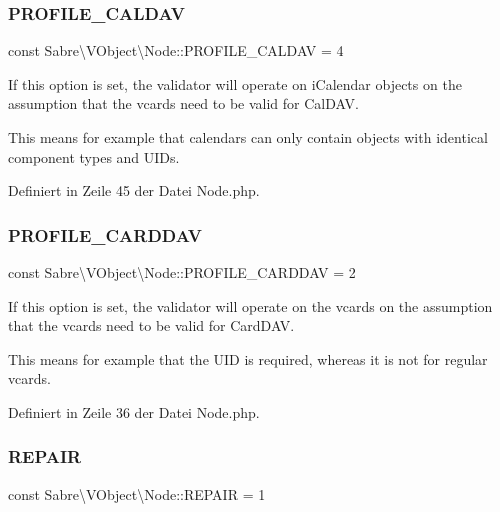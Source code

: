 \subsubsection{\texorpdfstring{P\+R\+O\+F\+I\+L\+E\+\_\+\+C\+A\+L\+D\+AV}{PROFILE\_CALDAV}}
{\footnotesize\ttfamily const Sabre\textbackslash{}\+V\+Object\textbackslash{}\+Node\+::\+P\+R\+O\+F\+I\+L\+E\+\_\+\+C\+A\+L\+D\+AV = 4}

If this option is set, the validator will operate on i\+Calendar objects on the assumption that the vcards need to be valid for Cal\+D\+AV.

This means for example that calendars can only contain objects with identical component types and U\+I\+Ds. 

Definiert in Zeile 45 der Datei Node.\+php.

\mbox{\label{class_sabre_1_1_v_object_1_1_node_a0aac3de0b04bcc44bbf0e22ae47a51c3}} 
\subsubsection{\texorpdfstring{P\+R\+O\+F\+I\+L\+E\+\_\+\+C\+A\+R\+D\+D\+AV}{PROFILE\_CARDDAV}}
{\footnotesize\ttfamily const Sabre\textbackslash{}\+V\+Object\textbackslash{}\+Node\+::\+P\+R\+O\+F\+I\+L\+E\+\_\+\+C\+A\+R\+D\+D\+AV = 2}

If this option is set, the validator will operate on the vcards on the assumption that the vcards need to be valid for Card\+D\+AV.

This means for example that the U\+ID is required, whereas it is not for regular vcards. 

Definiert in Zeile 36 der Datei Node.\+php.

\mbox{\label{class_sabre_1_1_v_object_1_1_node_ac97a7fb85c1f871523336cd1ec6b29a9}} 
\subsubsection{\texorpdfstring{R\+E\+P\+A\+IR}{REPAIR}}
{\footnotesize\ttfamily const Sabre\textbackslash{}\+V\+Object\textbackslash{}\+Node\+::\+R\+E\+P\+A\+IR = 1}

